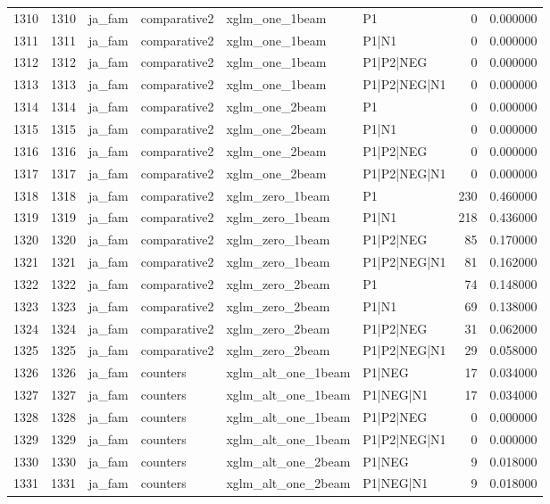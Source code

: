\begin{tabular}{lrllllrr}
1310 & 1310 & ja_fam & comparative2 & xglm_one_1beam & P1 & 0 & 0.000000 \\
1311 & 1311 & ja_fam & comparative2 & xglm_one_1beam & P1|N1 & 0 & 0.000000 \\
1312 & 1312 & ja_fam & comparative2 & xglm_one_1beam & P1|P2|NEG & 0 & 0.000000 \\
1313 & 1313 & ja_fam & comparative2 & xglm_one_1beam & P1|P2|NEG|N1 & 0 & 0.000000 \\
1314 & 1314 & ja_fam & comparative2 & xglm_one_2beam & P1 & 0 & 0.000000 \\
1315 & 1315 & ja_fam & comparative2 & xglm_one_2beam & P1|N1 & 0 & 0.000000 \\
1316 & 1316 & ja_fam & comparative2 & xglm_one_2beam & P1|P2|NEG & 0 & 0.000000 \\
1317 & 1317 & ja_fam & comparative2 & xglm_one_2beam & P1|P2|NEG|N1 & 0 & 0.000000 \\
1318 & 1318 & ja_fam & comparative2 & xglm_zero_1beam & P1 & 230 & 0.460000 \\
1319 & 1319 & ja_fam & comparative2 & xglm_zero_1beam & P1|N1 & 218 & 0.436000 \\
1320 & 1320 & ja_fam & comparative2 & xglm_zero_1beam & P1|P2|NEG & 85 & 0.170000 \\
1321 & 1321 & ja_fam & comparative2 & xglm_zero_1beam & P1|P2|NEG|N1 & 81 & 0.162000 \\
1322 & 1322 & ja_fam & comparative2 & xglm_zero_2beam & P1 & 74 & 0.148000 \\
1323 & 1323 & ja_fam & comparative2 & xglm_zero_2beam & P1|N1 & 69 & 0.138000 \\
1324 & 1324 & ja_fam & comparative2 & xglm_zero_2beam & P1|P2|NEG & 31 & 0.062000 \\
1325 & 1325 & ja_fam & comparative2 & xglm_zero_2beam & P1|P2|NEG|N1 & 29 & 0.058000 \\
1326 & 1326 & ja_fam & counters & xglm_alt_one_1beam & P1|NEG & 17 & 0.034000 \\
1327 & 1327 & ja_fam & counters & xglm_alt_one_1beam & P1|NEG|N1 & 17 & 0.034000 \\
1328 & 1328 & ja_fam & counters & xglm_alt_one_1beam & P1|P2|NEG & 0 & 0.000000 \\
1329 & 1329 & ja_fam & counters & xglm_alt_one_1beam & P1|P2|NEG|N1 & 0 & 0.000000 \\
1330 & 1330 & ja_fam & counters & xglm_alt_one_2beam & P1|NEG & 9 & 0.018000 \\
1331 & 1331 & ja_fam & counters & xglm_alt_one_2beam & P1|NEG|N1 & 9 & 0.018000 \\

\end{tabular}
